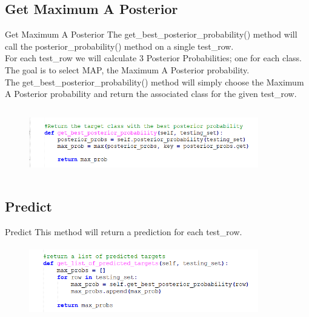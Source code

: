 \documentclass{beamer}
\begin{document}
\subsection{Get Maximum A Posterior}
    \begin{frame}{Get Maximum A Posterior}
        \hspace{0.5cm} The get\_best\_posterior\_probability() method will call the posterior\_probability() method on a single test\_row. \\
        \hspace{0.5cm} For each test\_row we will calculate 3 Posterior Probabilities; one for each class. The goal is to select MAP, the Maximum A Posterior probability. \\
        \hspace{0.5cm} The get\_best\_posterior\_probability() method will simply choose the Maximum A Posterior probability and return the associated class for the given test\_row.\\
        \begin{center}
            \begin{figure}
                \begin{center}
                    \includegraphics[width = 10cm, height = 3cm]{Theme/images/get_best.PNG}
                \end{center}
            \end{figure}
        \end{center}
    \end{frame}

\subsection{Predict}
    \begin{frame}{Predict}
        \hspace{0.5cm} This method will return a prediction for each test\_row. \\
        \begin{center}
            \begin{figure}
                \begin{center}
                    \includegraphics[width = 10cm, height = 3cm]{Theme/images/get_list.PNG}
                \end{center}
            \end{figure}
        \end{center}
    \end{frame}
\end{document}
